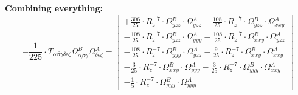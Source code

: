 \documentclass{article}
\begin{document}
\textbf{Combining everything:}
\begin{equation}
- \frac{1}{225} \cdot T_{\alpha{}\beta{}\gamma{}\delta{}\epsilon{}\zeta{}} \Omega{}^{B}_{\alpha{}\beta{}\gamma{}} \Omega{}^{A}_{\delta{}\epsilon{}\zeta{}} =  \left[ \begin{array}{c} 
 		+ \frac{306}{25} \cdot R_{z}^{-7} \cdot \Omega{}^{B}_{yzz} \cdot \Omega{}^{A}_{yzz}- \frac{108}{25} \cdot R_{z}^{-7} \cdot \Omega{}^{B}_{yzz} \cdot \Omega{}^{A}_{xxy} 
 \\[0.2em] 		 - \frac{108}{25} \cdot R_{z}^{-7} \cdot \Omega{}^{B}_{yzz} \cdot \Omega{}^{A}_{yyy}- \frac{108}{25} \cdot R_{z}^{-7} \cdot \Omega{}^{B}_{xxy} \cdot \Omega{}^{A}_{yzz} 
 \\[0.2em] 		 - \frac{108}{25} \cdot R_{z}^{-7} \cdot \Omega{}^{B}_{yyy} \cdot \Omega{}^{A}_{yzz}- \frac{9}{25} \cdot R_{z}^{-7} \cdot \Omega{}^{B}_{xxy} \cdot \Omega{}^{A}_{xxy} 
 \\[0.2em] 		 - \frac{3}{25} \cdot R_{z}^{-7} \cdot \Omega{}^{B}_{xxy} \cdot \Omega{}^{A}_{yyy}- \frac{3}{25} \cdot R_{z}^{-7} \cdot \Omega{}^{B}_{yyy} \cdot \Omega{}^{A}_{xxy} 
 \\[0.2em] 		 - \frac{1}{5} \cdot R_{z}^{-7} \cdot \Omega{}^{B}_{yyy} \cdot \Omega{}^{A}_{yyy}
 \end{array}\right] 
\end{equation}
\end{document}
